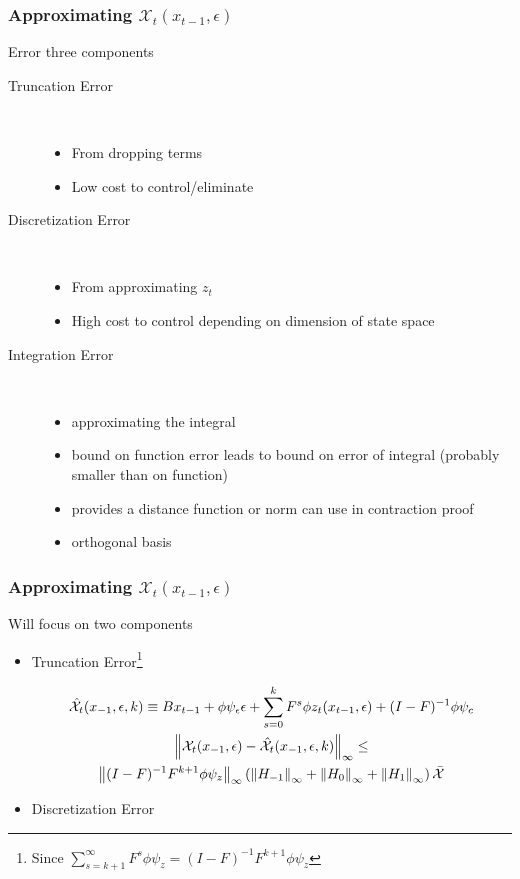 \documentclass[tikz]{beamer}
\begin{document}
\begin{frame}
\frametitle{Approximating $\mathcal{X}_t(x_{t-1},\epsilon)$} 

{\small

Error three components

\begin{description}
\item[Truncation Error] \ 
  \begin{itemize}
  \item From dropping terms
  \item Low cost to control/eliminate
  \end{itemize}
\item[Discretization Error] \ 
  \begin{itemize}
\item From approximating $z_t$
\item High cost to control depending on dimension of state space
  \end{itemize}
\item[Integration Error] \ 
  \begin{itemize}
  \item approximating the integral
\item bound on function error leads to bound on error of integral (probably smaller than on function)
  \item provides a distance function or norm can use in contraction proof
  \item orthogonal basis
  \end{itemize}


\end{description}
}
\end{frame}


\begin{frame}
\frametitle{Approximating $\mathcal{X}_t(x_{t-1},\epsilon)$} 

{\small

Will focus on  two components

\begin{itemize}
\item Truncation Error\footnote{Since
$\sum_{s=k+1}^{\infty} F^s \phi \psi_z = (I -F)^{-1} F^{k+1}\phi \psi_z$}

 	 \begin{gather}
 	 \hat{\mathcal{X}}_{t}(x_{-1},\epsilon,k) \equiv B x_{t-1}+ \phi \psi_\epsilon\epsilon + \sum_{s=0}^k F^s \phi z_{t}(x_{t-1},\epsilon) + (I - F)^{-1} \phi \psi_c \label{theTruncSeries}\\
      \label{eq:1}
\left\lVert\mathcal{X}_{t}(x_{-1},\epsilon)-\hat{\mathcal{X}}_{t}(x_{-1},\epsilon,k)\right\rVert_\infty \le\\ \left\lVert(I -F)^{-1} F^{k+1}\phi \psi_z\right\rVert_\infty \left ( \left\lVert H_{-1} \right\rVert_\infty+ \left\lVert H_{0} \right\rVert_\infty+ \left\lVert H_{1} \right\rVert_\infty \right )\bar{\mathcal{X}}
    \end{gather}

\item Discretization Error


\end{itemize}

}
\end{frame}
\end{document}
